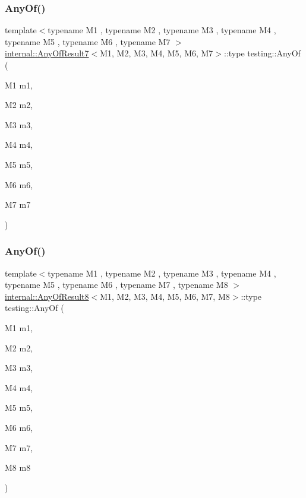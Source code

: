 \mbox{\label{namespacetesting_a754d1bddb237e79613f6834af3329efa}} 
\subsubsection{\texorpdfstring{AnyOf()}{AnyOf()}\hspace{0.1cm}{\footnotesize\ttfamily [6/9]}}
{\footnotesize\ttfamily template$<$typename M1 , typename M2 , typename M3 , typename M4 , typename M5 , typename M6 , typename M7 $>$ \\
\mbox{\hyperlink{structtesting_1_1internal_1_1_any_of_result7}{internal\+::\+Any\+Of\+Result7}}$<$M1, M2, M3, M4, M5, M6, M7$>$\+::type testing\+::\+Any\+Of (\begin{DoxyParamCaption}\item[{M1}]{m1,  }\item[{M2}]{m2,  }\item[{M3}]{m3,  }\item[{M4}]{m4,  }\item[{M5}]{m5,  }\item[{M6}]{m6,  }\item[{M7}]{m7 }\end{DoxyParamCaption})\hspace{0.3cm}{\ttfamily [inline]}}

\mbox{\label{namespacetesting_a9c979c62cc004664b14e0ce444e531d5}} 
\subsubsection{\texorpdfstring{AnyOf()}{AnyOf()}\hspace{0.1cm}{\footnotesize\ttfamily [7/9]}}
{\footnotesize\ttfamily template$<$typename M1 , typename M2 , typename M3 , typename M4 , typename M5 , typename M6 , typename M7 , typename M8 $>$ \\
\mbox{\hyperlink{structtesting_1_1internal_1_1_any_of_result8}{internal\+::\+Any\+Of\+Result8}}$<$M1, M2, M3, M4, M5, M6, M7, M8$>$\+::type testing\+::\+Any\+Of (\begin{DoxyParamCaption}\item[{M1}]{m1,  }\item[{M2}]{m2,  }\item[{M3}]{m3,  }\item[{M4}]{m4,  }\item[{M5}]{m5,  }\item[{M6}]{m6,  }\item[{M7}]{m7,  }\item[{M8}]{m8 }\end{DoxyParamCaption})\hspace{0.3cm}{\ttfamily [inline]}}

